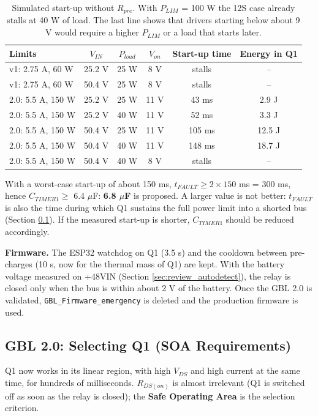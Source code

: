 \documentclass[11pt,a4paper]{article}
\begin{document}
\begin{table}[H]
\centering
\begin{tabular}{lccccc}
\toprule
Limits & $V_{IN}$ & $P_{load}$ & $V_{on}$ & Start-up time & Energy in Q1 \\
\midrule
v1: 2.75 A, 60 W & 25.2 V & 25 W & 8 V & stalls & -- \\
v1: 2.75 A, 60 W & 50.4 V & 25 W & 8 V & stalls & -- \\
2.0: 5.5 A, 150 W & 25.2 V & 25 W & 11 V & 43 ms & 2.9 J \\
2.0: 5.5 A, 150 W & 25.2 V & 40 W & 11 V & 52 ms & 3.3 J \\
2.0: 5.5 A, 150 W & 50.4 V & 25 W & 11 V & 105 ms & 12.5 J \\
2.0: 5.5 A, 150 W & 50.4 V & 40 W & 11 V & 148 ms & 18.7 J \\
2.0: 5.5 A, 150 W & 50.4 V & 40 W & 8 V & stalls & -- \\
\bottomrule
\end{tabular}
\caption{Simulated start-up without $R_{pre}$. With $P_{LIM}$ = 100 W the 12S case already stalls at 40 W of load. The last line shows that drivers starting below about 9 V would require a higher $P_{LIM}$ or a load that starts later.}
\label{tab:gbl2_sim}
\end{table}

With a worst-case start-up of about 150 ms, $t_{FAULT} \geq 2 \times 150$ ms = 300 ms, hence $C_{TIMER1} \geq$ 6.4 $\mu$F: \textbf{6.8 $\mu$F} is proposed. A larger value is not better: $t_{FAULT}$ is also the time during which Q1 sustains the full power limit into a shorted bus (Section \ref{sec:gbl2_q1}). If the measured start-up is shorter, $C_{TIMER1}$ should be reduced accordingly.

\textbf{Firmware.} The ESP32 watchdog on Q1 (3.5 s) and the cooldown between pre-charges (10 s, now for the thermal mass of Q1) are kept. With the battery voltage measured on +48VIN (Section \ref{sec:review_autodetect}), the relay is closed only when the bus is within about 2 V of the battery. Once the GBL 2.0 is validated, \texttt{GBL\_Firmware\_emergency} is deleted and the production firmware is used.

\subsection{GBL 2.0: Selecting Q1 (SOA Requirements)}
\label{sec:gbl2_q1}

Q1 now works in its linear region, with high $V_{DS}$ and high current at the same time, for hundreds of milliseconds. $R_{DS(on)}$ is almost irrelevant (Q1 is switched off as soon as the relay is closed); the \textbf{Safe Operating Area} is the selection criterion.
\end{document}
